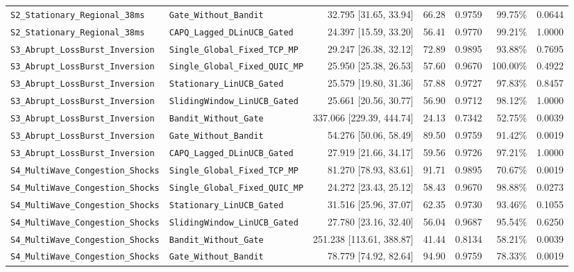 \begin{table}[t]
{\begin{tabular}{@{}llrrrrr@{}}
\texttt{S2\_Stationary\_Regional\_38ms} & \texttt{Gate\_Without\_Bandit} & 32.795 [31.65, 33.94] & 66.28 & 0.9759 & 99.75\% & 0.0644 \\
\texttt{S2\_Stationary\_Regional\_38ms} & \texttt{CAPQ\_Lagged\_DLinUCB\_Gated} & 24.397 [15.59, 33.20] & 56.41 & 0.9770 & 99.21\% & 1.0000 \\
\texttt{S3\_Abrupt\_LossBurst\_Inversion} & \texttt{Single\_Global\_Fixed\_TCP\_MP} & 29.247 [26.38, 32.12] & 72.89 & 0.9895 & 93.88\% & 0.7695 \\
\texttt{S3\_Abrupt\_LossBurst\_Inversion} & \texttt{Single\_Global\_Fixed\_QUIC\_MP} & 25.950 [25.38, 26.53] & 57.60 & 0.9670 & 100.00\% & 0.4922 \\
\texttt{S3\_Abrupt\_LossBurst\_Inversion} & \texttt{Stationary\_LinUCB\_Gated} & 25.579 [19.80, 31.36] & 57.88 & 0.9727 & 97.83\% & 0.8457 \\
\texttt{S3\_Abrupt\_LossBurst\_Inversion} & \texttt{SlidingWindow\_LinUCB\_Gated} & 25.661 [20.56, 30.77] & 56.90 & 0.9712 & 98.12\% & 1.0000 \\
\texttt{S3\_Abrupt\_LossBurst\_Inversion} & \texttt{Bandit\_Without\_Gate} & 337.066 [229.39, 444.74] & 24.13 & 0.7342 & 52.75\% & 0.0039 \\
\texttt{S3\_Abrupt\_LossBurst\_Inversion} & \texttt{Gate\_Without\_Bandit} & 54.276 [50.06, 58.49] & 89.50 & 0.9759 & 91.42\% & 0.0019 \\
\texttt{S3\_Abrupt\_LossBurst\_Inversion} & \texttt{CAPQ\_Lagged\_DLinUCB\_Gated} & 27.919 [21.66, 34.17] & 59.56 & 0.9726 & 97.21\% & 1.0000 \\
\texttt{S4\_MultiWave\_Congestion\_Shocks} & \texttt{Single\_Global\_Fixed\_TCP\_MP} & 81.270 [78.93, 83.61] & 91.71 & 0.9895 & 70.67\% & 0.0019 \\
\texttt{S4\_MultiWave\_Congestion\_Shocks} & \texttt{Single\_Global\_Fixed\_QUIC\_MP} & 24.272 [23.43, 25.12] & 58.43 & 0.9670 & 98.88\% & 0.0273 \\
\texttt{S4\_MultiWave\_Congestion\_Shocks} & \texttt{Stationary\_LinUCB\_Gated} & 31.516 [25.96, 37.07] & 62.35 & 0.9730 & 93.46\% & 0.1055 \\
\texttt{S4\_MultiWave\_Congestion\_Shocks} & \texttt{SlidingWindow\_LinUCB\_Gated} & 27.780 [23.16, 32.40] & 56.04 & 0.9687 & 95.54\% & 0.6250 \\
\texttt{S4\_MultiWave\_Congestion\_Shocks} & \texttt{Bandit\_Without\_Gate} & 251.238 [113.61, 388.87] & 41.44 & 0.8134 & 58.21\% & 0.0039 \\
\texttt{S4\_MultiWave\_Congestion\_Shocks} & \texttt{Gate\_Without\_Bandit} & 78.779 [74.92, 82.64] & 94.90 & 0.9759 & 78.33\% & 0.0019 \\

\end{tabular}}
\end{table}
